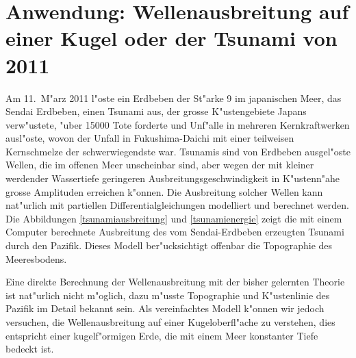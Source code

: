 \section{Anwendung: Wellenausbreitung auf einer Kugel oder der Tsunami von 2011}
Am 11.~M"arz 2011 l"oste ein Erdbeben der St"arke 9 im japanischen
Meer, das Sendai Erdbeben, einen Tsunami aus, der grosse K"ustengebiete
Japans verw"ustete, "uber
15000 Tote forderte und Unf"alle in mehreren Kernkraftwerken
ausl"oste, wovon der Unfall in Fukushima-Daichi mit einer
teilweisen Kernschmelze der schwerwiegendste war.
Tsunamis sind von Erdbeben ausgel"oste Wellen, die im offenen
Meer unscheinbar sind, aber wegen der mit kleiner werdender Wassertiefe
geringeren Ausbreitungsgeschwindigkeit in K"ustenn"ahe grosse
Amplituden erreichen k"onnen. Die Ausbreitung solcher Wellen
kann nat"urlich mit partiellen Differentialgleichungen modelliert
und berechnet werden. Die Abbildungen \ref{tsunamiausbreitung}
und \ref{tsunamienergie}
zeigt die mit einem Computer berechnete Ausbreitung des vom
Sendai-Erdbeben erzeugten Tsunami durch den Pazifik.
Dieses Modell ber"ucksichtigt offenbar die Topographie des
Meeresbodens.

Eine direkte Berechnung der Wellenausbreitung mit der bisher
gelernten Theorie ist nat"urlich nicht m"oglich, dazu m"usste
Topographie und K"ustenlinie des Pazifik im Detail bekannt
sein. Als vereinfachtes
Modell k"onnen wir jedoch versuchen, die Wellenausbreitung auf
einer Kugeloberfl"ache zu verstehen, dies entspricht einer 
kugelf"ormigen Erde, die mit einem Meer konstanter Tiefe bedeckt
ist.

